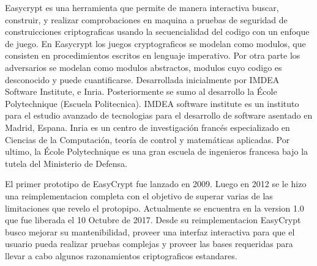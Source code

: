 \documentclass[runningheads]{llncs}
\begin{document}
Easycrypt es una herramienta que permite de manera interactiva buscar, construir, y realizar comprobaciones en maquina a pruebas de seguridad de construicciones criptograficas usando la secuencialidad del codigo con un enfoque de juego. En Easycrypt los juegos cryptograficos se modelan como modulos, que consisten en procedimientos escritos en lenguaje imperativo. Por otra parte los adversarios se modelan como modulos abstractos, modulos cuyo codigo es desconocido y puede cuantificarse. Desarrollada inicialmente por IMDEA Software Institute, e Inria. Posteriormente se sumo al desarrollo la École Polytechnique (Escuela Politecnica). IMDEA software institute es un instituto para el estudio avanzado de tecnologias para el desarrollo de software asentado en Madrid, Espana. Inria es un centro de investigación francés especializado en Ciencias de la Computación, teoría de control y matemáticas aplicadas. Por ultimo, la École Polytechnique es una gran escuela de ingenieros francesa bajo la tutela del Ministerio de Defensa.

El primer prototipo de EasyCrypt fue lanzado en 2009. Luego en 2012 se le hizo una reimplementacion completa con el objetivo de superar varias de las limitaciones que revelo el protopipo. Actualmente se encuentra en la version 1.0 que fue liberada el 10 Octubre de 2017. Desde su reimplementacion EasyCrypt busco mejorar su mantenibilidad, proveer una interfaz interactiva para que el usuario pueda realizar pruebas complejas y proveer las bases requeridas para llevar a cabo algunos razonamientos criptograficos estandares.




\end{document}
